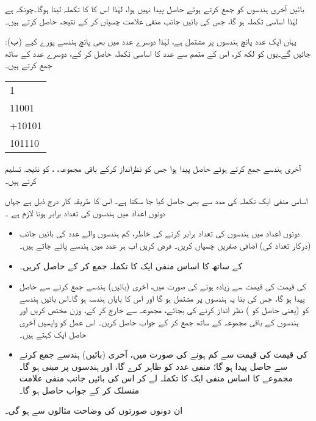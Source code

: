 بائیں آخری ہندسوں کو جمع کرتے ہوئے حاصل  پیدا نہیں ہوا، لہٰذا اس کا  کا تکملہ لینا ہوگا۔چونکہ  ہے لہٰذا اساسی تکملہ  ہو گا، جس کی بائیں جانب منفی علامت چسپاں کر کے نتیجہ  حاصل کرتے ہیں۔

:\quad (ب) یہاں ایک عدد پانچ ہندسوں پر مشتمل ہے، لہٰذا دوسرے عدد میں بھی پانچ ہندسے پورے کیے جائیں گے۔یوں  کو  لکھ کر، اس کے متمم 
  سے عدد کا اساسی تکملہ  حاصل کر کے، دوسرے عدد کے ساتھ جمع کرتے ہیں۔
 \begin{center}
\begin{otherlanguage}{english}
\begin{tabular}{L}
\phantom{1}1\\
\phantom{+}11001\\
+10101\\
\midrule
\phantom{\,\,}101110
\end{tabular}
\end{otherlanguage}
\end{center}

آخری ہندسے جمع کرتے ہوئے حاصل  پیدا ہوا جس کو نظرانداز کرکے باقی مجموعہ،  ، کو نتیجہ تسلیم کرتے ہیں۔


اساس منفی ایک تکملہ کی مدد سے بھی  حاصل کیا جا سکتا ہے۔ اس کا طریقہ کار درج ذیل ہے جہاں دونوں اعداد میں ہندسوں کی تعداد برابر ہونا لازم ہے ۔
\begin{itemize}
 \item
 دونوں اعداد میں ہندسوں کی تعداد برابر کرنے کی خاطر، کم ہندسوں والے عدد کی بائیں جانب (درکار تعداد کی) اضافی صفریں چسپاں کریں۔ فرض کریں اب ہر عدد میں  ہندسے پائے جاتے ہیں۔ 
 \item
  کے ساتھ  کا اساس منفی ایک کا تکملہ جمع کر کے   حاصل کریں۔
 \item
  کی قیمت  کی قیمت سے زیادہ ہونے کی صورت میں، آخری (بائیں) ہندسے جمع کرنے سے حاصل  پیدا ہو گا، جس کی بنا یہ   ہندسوں پر مشتمل ہو گا اور اس کا بایاں ہندسہ  ہو گا۔اس بائیں ہندسے کو (یعنی حاصل  کو ) نظر انداز کرنے کی بجائے، مجموعہ سے خارج کر کے،  وزن مختص کریں اور  ہندسوں کے باقی مجموعہ کے ساتھ جمع کر کے جواب حاصل کریں۔ اس عمل کو واپسیں آخری حاصل ایک  کہتے ہیں۔
 \item
{}کی قیمت  کی قیمت سے کم ہونے کی صورت میں، آخری (بائیں) ہندسے جمع کرنے سے حاصل  پیدا  ہو گا؛  منفی عدد کو ظاہر کرے گا، اور  ہندسوں پر مبنی ہو گا۔مجموعے کا اساس منفی ایک کا تکملہ لے کر اس کی بائیں جانب منفی علامت منسلک کر کے جواب حاصل ہو گا۔
\end{itemize}
ان دونوں صورتوں کی وضاحت مثالوں سے ہو گی۔ 

